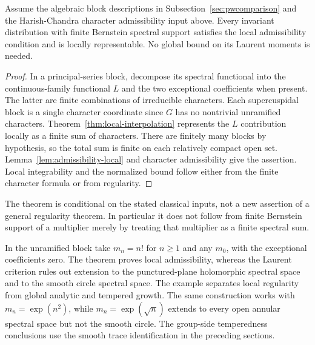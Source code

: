 \begin{theorem}\label{thm:finite-block-admissibility}
Assume the algebraic block descriptions in Subsection~\ref{sec:pwcomparison} and the Harish-Chandra character admissibility input above. Every invariant distribution with finite Bernstein spectral support satisfies the local admissibility condition and is locally representable. No global bound on its Laurent moments is needed.
\end{theorem}
\begin{proof}
In a principal-series block, decompose its spectral functional into the continuous-family functional $L$ and the two exceptional coefficients when present. The latter are finite combinations of irreducible characters. Each supercuspidal block is a single character coordinate since $G$ has no nontrivial unramified characters. Theorem~\ref{thm:local-interpolation} represents the $L$ contribution locally as a finite sum of characters. There are finitely many blocks by hypothesis, so the total sum is finite on each relatively compact open set. Lemma~\ref{lem:admissibility-local} and character admissibility give the assertion. Local integrability and the normalized bound follow either from the finite character formula or from regularity.
\end{proof}
The theorem is conditional on the stated classical inputs, not a new assertion of a general regularity theorem. In particular it does not follow from finite Bernstein support of a multiplier merely by treating that multiplier as a finite spectral sum.

\begin{center}
\end{center}

\begin{example}
In the unramified block take $m_n=n!$ for $n\ge1$ and any $m_0$, with the exceptional coefficients zero. The theorem proves local admissibility, whereas the Laurent criterion rules out extension to the punctured-plane holomorphic spectral space and to the smooth circle spectral space. The example separates local regularity from global analytic and tempered growth. The same construction works with $m_n=\exp(n^2)$, while $m_n=\exp(\sqrt n)$ extends to every open annular spectral space but not the smooth circle. The group-side temperedness conclusions use the smooth trace identification in the preceding sections.
\end{example}

